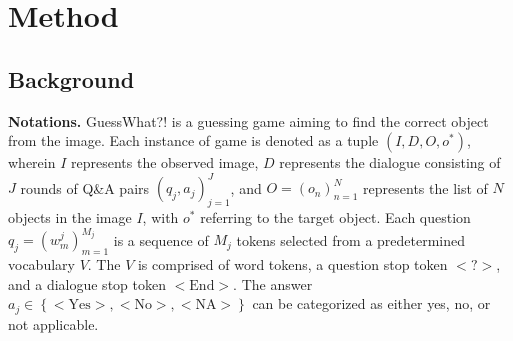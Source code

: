 \section{Method}







\subsection{Background}



% 


\textbf{Notations.} GuessWhat?! is a guessing game aiming to find the correct object from the image. Each instance of game is denoted as a tuple $\left( I, D, O, o^* \right) $, wherein $I$ represents the observed image, $D$ represents the dialogue consisting of $J$ rounds of Q\&A pairs $\left( q_j,a_j \right) _{j=1}^{J}$, and $O=\left( o_n \right) _{n=1}^{N}$ represents the list of $N$ objects in the image $I$, with $o^*$ referring to the target object. Each question $q_j=\left( w_{m}^{j} \right) _{m=1}^{M_j}$ is a sequence of $M_j$ tokens selected from a predetermined vocabulary $V$. The $V$ is comprised of word tokens, a question stop token $<\mathrm{?}>$, and a dialogue stop token $<\mathrm{End}>$. The answer $a_j\in \left\{ <\mathrm{Yes}>,<\mathrm{No}>,<\mathrm{NA}> \right\} $ can be categorized as either yes, no, or not applicable. 

